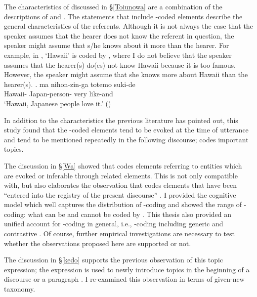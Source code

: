 The characteristics of 
discussed in \S \ref{Toiunowa}
are a combination of
the descriptions of  and .
The statements that include -coded elements describe the general characteristics of the referents.
Although it is not always the case that the speaker assumes that the hearer does not know the referent in question,
the speaker might assume that s/he knows about it more than the hearer.
For example, in \Next,
 `Hawaii' is coded by ,
where I do not believe that
the speaker assumes that the hearer(s) do(es) not know Hawaii
because it is too famous.
However, the speaker might assume that she knows more about Hawaii than the hearer(s).
%
\exg.  ma nihon-zin-ga totemo suki-de \\
	Hawaii-  Japan-person- very like-and \\
	`Hawaii, Japanese people love it.'
	\hfill{()}

In addition to the characteristics the previous literature has pointed out,
this study found that
the -coded elements tend to be evoked at the time of utterance
and tend to be mentioned repeatedly in the following discourse;
 codes important topics.

The discussion in \S \ref{Wa} showed that
 codes elements referring to entities which are
evoked or inferable through related elements.
This is not only compatible with, but also elaborates the observation that
 codes elements that have been ``entered into the registry of the present discourse'' \cite[45]{kuno73}.
I provided the cognitive model which well captures the distribution of -coding and showed the range of -coding:
what can be and cannot be coded by .
This thesis also provided an unified account for -coding in general,
i.e., -coding including generic and contrastive .
Of course, further empirical investigations are necessary to test whether the observations proposed here are supported or not.

The discussion in \S \ref{kedo} supports the previous observation of this topic expression;
the expression is used to newly introduce topics in the beginning of a discourse or a paragraph \cite{koide84,takahashi99}.
I re-examined this observation in terms of given-new taxonomy.

